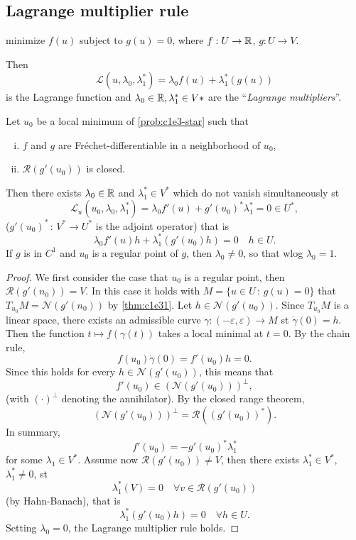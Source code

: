 \documentclass[../skript.tex]{subfiles}
\begin{document}
\subsection{Lagrange multiplier rule}
\begin{problem} %
\label{prob:c1e3-star}
minimize $f(u)$ subject to $g(u) = 0$,
where $f : U \to \mathbb{R}$, $g : U \to V$.
\end{problem}
Then
\[
	\mathcal{L}(u, \lambda_0, \lambda_1^*) = \lambda_0 f(u) + \lambda_1^* (g(u))
\]
is the Lagrange function and $\lambda_0 \in \mathbb{R}, \lambda_1^* \in V*$ are the ``\emph{Lagrange multipliers}''.
\begin{theorem} %
\label{thm:c1e32}
Let $u_0$ be a local minimum of \cref{prob:c1e3-star} such that
\begin{enumerate}[(i)]
\item $f$ and $g$ are Fréchet-differentiable in a neighborhood of $u_0$,
\item $\mathcal{R}(g'(u_0))$ is closed.
\end{enumerate}
Then there exists $\lambda_0 \in \mathbb{R}$ and $\lambda_1^* \in V^*$ which do not vanish simultaneously \ac{st}
\[
\mathcal{L}_u(u_0, \lambda_0, \lambda_1^*) = \lambda_0 f'(u) + g'(u_0)^* \lambda_1^* = 0 \in U^*,
\]
($g'(u_0)^* \, : \, V^* \to U^*$ is the adjoint operator) that is
\[
\lambda_0 f'(u) h + \lambda_1^* (g'(u_0)h) = 0 \quad h \in U.
\]
If $g$ is in $C^1$ and $u_0$ is a regular point of $g$, then $\lambda_0 \neq 0$, so that \ac{wlog} $\lambda_0 = 1$.
\end{theorem}
\begin{proof}
We first consider the case that $u_0$ is a regular point, then $\mathcal{R}(g'(n_0)) = V$. In this case it holds with $M = \{ u \in U \, : \, g(u) = 0\}$ that $T_{u_0} M = \mathcal{N}(g'(n_0))$ by \cref{thm:c1e31}. Let $h \in \mathcal{N}(g'(u_0))$. Since $T_{u_0} M$ is a linear space, there exists an admissible curve $\gamma : (- \varepsilon, \varepsilon) \to M$ \ac{st} $\dot\gamma(0) = h$. Then the function $t \mapsto f(\gamma(t))$ takes a local minimal at $t=0$. By the chain rule,
\[
	f(u_0) \dot\gamma(0) = f'(u_0) h = 0.
\]
Since this holds for every $h \in \mathcal{N}(g'(u_0))$, this means that
\[
	f'(u_0) \in (\mathcal{N}(g'(u_0)))^\perp,
\]
(with $(\cdot)^\perp$ denoting the annihilator). By the closed range theorem,
\[
	(\mathcal{N}(g'(u_0)))^\perp = \mathcal{R}((g'(u_0))^*).
\]
In summary,
\[
	f'(u_0) = -g'(u_0)^* \lambda_1^*
\]
for some $\lambda_1 \in V^*$.
Assume now $\mathcal{R}(g'(u_0)) \neq V$, then there exists $\lambda_1^* \in V^*$, $\lambda_1^* \neq 0$, \ac{st}
\[
	\lambda_1^*(V) = 0 \quad \forall v \in \mathcal{R}(g'(u_0))
\]
(by Hahn-Banach), that is
\[
	\lambda_1^*(g'(u_0)h) = 0 \quad \forall h \in U.
\]
Setting $\lambda_0 = 0$, the Lagrange multiplier rule holds.
\end{proof}
\end{document}
